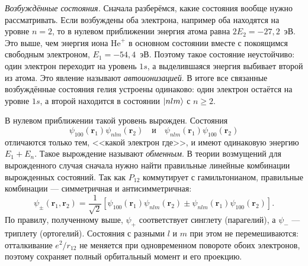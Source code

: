 \textit{Возбуждённые состояния.} Сначала разберёмся, какие состояния вообще
нужно рассматривать. Если возбуждены оба электрона, например оба находятся на
уровне $n = 2$, то в нулевом приближении энергия атома равна $2E_2 =
    -27{,}2$~эВ. Это выше, чем энергия иона $\text{He}^+$ в основном состоянии
вместе с покоящимся свободным электроном, $E_1 = -54{,}4$~эВ. Поэтому такое
состояние неустойчиво: один электрон переходит на уровень $1s$, а выделившаяся
энергия выбивает второй из атома. Это явление называют \textit{автоионизацией}.
В итоге все связанные возбуждённые состояния гелия устроены одинаково: один
электрон остаётся на уровне $1s$, а второй находится в состоянии $\lvert nlm\rangle$ с
$n \geq 2$.

В нулевом приближении такой уровень вырожден. Состояния
\[
  \psi_{100}(\mathbf{r}_1)\psi_{nlm}(\mathbf{r}_2) \quad\text{и}\quad
  \psi_{nlm}(\mathbf{r}_1)\psi_{100}(\mathbf{r}_2)
\]
отличаются только тем, <<какой электрон где>>, и имеют одинаковую энергию $E_1
  + E_n$. Такое вырождение называют \textit{обменным}. В теории возмущений для
вырожденного случая сначала нужно найти правильные линейные комбинации
вырожденных состояний. Так как $P_{12}$ коммутирует с гамильтонианом,
правильные комбинации --- симметричная и антисимметричная:
\[
  \psi_\pm(\mathbf{r}_1, \mathbf{r}_2) =
  \frac{1}{\sqrt{2}}\left[\psi_{100}(\mathbf{r}_1)\psi_{nlm}(\mathbf{r}_2) \pm
    \psi_{nlm}(\mathbf{r}_1)\psi_{100}(\mathbf{r}_2)\right].
\]
По правилу, полученному выше, $\psi_+$ соответствует синглету (парагелий), а
$\psi_-$ --- триплету (ортогелий). Состояния с разными $l$ и $m$ при этом не
перемешиваются: отталкивание $e^2/r_{12}$ не меняется при одновременном
повороте обоих электронов, поэтому сохраняет полный орбитальный момент и его
проекцию.

